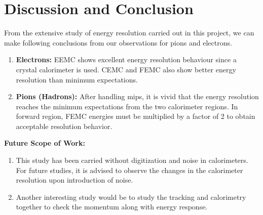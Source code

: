 \chapter{Discussion and Conclusion}
From the extensive study of energy resolution carried out in this project, we can make following conclusions from our observations for pions and electrons.

\begin{enumerate}
\item \textbf{Electrons:} EEMC shows excellent energy resolution behaviour since a crystal calorimeter is used. 
CEMC and FEMC also show better energy resolution than minimum expectations.
\item \textbf{Pions (Hadrons):} After handling mips, it is vivid that the energy resolution reaches the minimum expectations from the two calorimeter regions. In forward region, FEMC energies must be multiplied by a factor of 2 to obtain acceptable resolution behavior.

\end{enumerate}

\textbf{Future Scope of Work:}
\begin{enumerate}
    \item This study has been carried without digitization and noise in calorimeters. For future studies, it is advised to observe the changes in the calorimeter resolution upon introduction of noise.
    \item Another interesting study would be to study the tracking and calorimetry together to check the momentum along with energy response.
\end{enumerate}




















\begin{comment}

\begin{figure}[h!]
    \centering
    \texttt{[image: CEMC\_sigmaE\_ge\_EtaCut\_CircularCut.png]}
    \caption{Energy Resolution of CEMC}
    \label{fig:CEMC}
\end{figure}

\begin{figure}[h!]
    \centering
    \texttt{[image: FEMC\_Sigma.png]}
    \caption{Energy Resolution of FEMC}
    \label{fig:FEMC}
\end{figure}

\begin{figure}[h!]
    \centering
    \texttt{[image: EEMC\_Sigma.png]}
    \caption{Energy Resolution of EEMC}
    \label{fig:EEMC}
\end{figure}
\end{comment}


